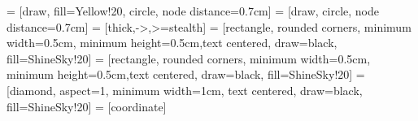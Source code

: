 
 = [draw, fill=Yellow!20, circle, node distance=0.7cm]
 = [draw, circle, node distance=0.7cm]
 = [thick,->,>=stealth]
 = [rectangle, rounded corners, minimum width=0.5cm, minimum 
height=0.5cm,text centered, draw=black, fill=ShineSky!20]
 = [rectangle, rounded corners, minimum width=0.5cm, minimum 
height=0.5cm,text centered, draw=black, fill=ShineSky!20]
 = [diamond, aspect=1, minimum width=1cm, text 
centered, draw=black, fill=ShineSky!20]
 = [coordinate]


